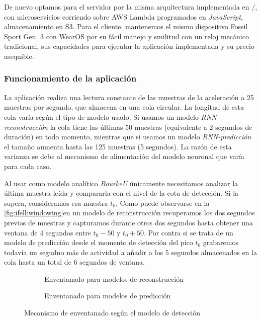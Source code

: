 De nuevo optamos para el servidor por la misma arquitectura implementada en \accelcapture/, con microservicios corriendo sobre AWS Lambda programados en \textit{JavaScript}, almacenamiento en S3. Para el cliente, mantenemos el mismo dispositivo Fossil Sport Gen. 3 con WearOS por su fácil manejo y smilitud con un reloj mecánico tradicional, sus capacidades para ejecutar la aplicación implementada y su precio asequible.

\subsubsection{Funcionamiento de la aplicación}\label{subsub:ifell:windowing}
La aplicación realiza una lectura constante de las muestras de la aceleración a 25 muestras por segundo, que almacena en una cola circular. La longitud de esta cola varía según el tipo de modelo usado. Si usamos un modelo \textit{RNN-reconstrucción} la cola tiene las últimas 50 muestras (equivalente a 2 segundos de duración) en todo momento, mientras que si usamos un modelo \textit{RNN-predicción} el tamaño aumenta hasta las 125 muestras (5 segundos). La razón de esta varianza se debe al mecanismo de alimentación del modelo neuronal que varía para cada caso.

Al usar como modelo analítico \textit{BourkeU} únicamente necesitamos analizar la última muestra leída y compararla con el nivel de la cota de detección. Si la supera, consideramos esa muestra $t_0$. Como puede observarse en la \autoref{fig:ifell:windowing}en un modelo de reconstrucción recuperamos los dos segundos previos de muestras y capturamos durante otros dos segundos hasta obtener una ventana de 4 segundos entre $t_0-50$ y $t_0+50$. Por contra si se trata de un modelo de predicción desde el momento de detección del pico $t_0$ grabaremos todavía un segudno más de actividad a añadir a los 5 segundos almacenados en la cola hasta un total de 6 segundos de ventana.  

\begin{figure}[hbt!]
  \centering
  \begin{subfigure}[t]{0.45\textwidth}
    \caption{\footnotesize \label{fig:ifell:detect:window} Enventanado para modelos de reconstrucción}
  \end{subfigure}
  \hfill
  \begin{subfigure}[t]{0.45\textwidth}
    \caption{\footnotesize \label{fig:ifell:predict:window} Enventanado para modelos de predicción}
  \end{subfigure}
  \caption{\footnotesize \label{fig:ifell:windowing} Mecanismo de enventanado según el modelo de detección}
\end{figure}

